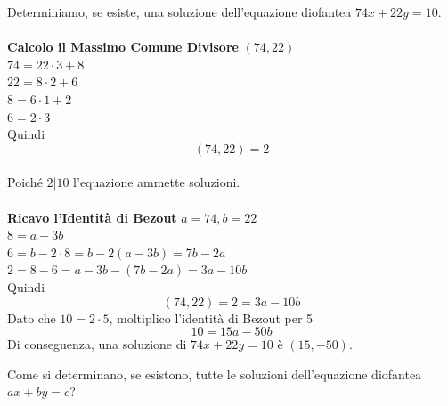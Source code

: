 \documentclass[a4paper,12pt, oneside]{book}
\begin{document}
\begin{shaded}
	\begin{esempio}
		Determiniamo, se esiste, una soluzione dell'equazione diofantea $74x+22y=10$.\\\\
		\textbf{Calcolo il Massimo Comune Divisore} $(74,22)$\\
		$74 = 22 \cdot 3 + 8$\\
		$22 = 8 \cdot 2 + 6$\\
		$8=6 \cdot 1 + 2$\\
		$6 = 2 \cdot 3$\\
		Quindi $$(74,22)=2$$\\
		Poiché $2|10$ l'equazione ammette soluzioni.\\\\
		\textbf{Ricavo l'Identità di Bezout} $a=74, b=22$\\
		$8 = a- 3b$\\
		$6 = b-2 \cdot 8 = b -2(a-3b) = 7b-2a$\\
		$2 = 8-6=a-3b-(7b-2a)=3a-10b$\\
		Quindi $$(74,22) = 2 = 3a-10b$$
		Dato che $10 = 2 \cdot 5$, moltiplico l'identità di Bezout per 5
		$$10 = 15a -50b$$
		Di conseguenza, una soluzione di $74x+22y=10$ è $(15,-50)$.
	\end{esempio}
\end{shaded}
Come si determinano, se esistono, tutte le soluzioni dell'equazione diofantea $ax+by=c$?
\end{document}
